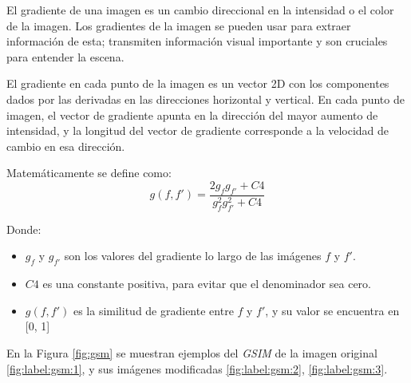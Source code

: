 El gradiente de una imagen es un cambio direccional en la intensidad o el color de la imagen. Los gradientes de la imagen se pueden usar para extraer información de esta; transmiten información visual importante y son cruciales para entender la escena.


El gradiente en cada punto de la imagen es un vector 2D con los componentes dados por las derivadas en las direcciones horizontal y vertical. En cada punto de imagen, el vector de gradiente apunta en la dirección del mayor aumento de intensidad, y la longitud del vector de gradiente corresponde a la velocidad de cambio en esa dirección.


Matemáticamente se define como:
\begin{equation}\label{eq:gradiente}
g(f,f') = \frac{2g_f g_{f'}+ C4} {g_f^{2} g_{f'}^{2} + C4}
\end{equation}

Donde: 
\begin{itemize}
\item $g_f$ y  $g_{f'}$ son los valores del gradiente lo largo de las imágenes $f$ y $f'$.
\item $C4$  es una constante positiva, para evitar que el denominador sea cero.
\item $g(f,f')$ es la similitud de gradiente entre  $f$ y $f'$, y su valor se encuentra en [0, 1]
\end{itemize}

En la Figura \ref{fig:gsm} se muestran ejemplos del \textit{GSIM} de la imagen original \ref{fig:label:gsm:1}, y sus imágenes modificadas \ref{fig:label:gsm:2}, \ref{fig:label:gsm:3}.

